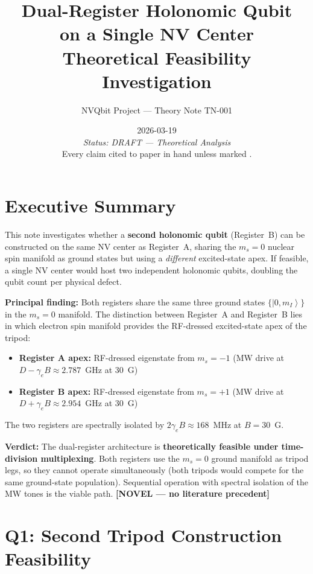 \documentclass[11pt,letterpaper]{article}
\title{\textbf{Dual-Register Holonomic Qubit\\on a Single NV Center}\\[0.5em]
\large Theoretical Feasibility Investigation}
\author{NVQbit Project --- Theory Note TN-001}
\date{2026-03-19\\\medskip
\normalsize\textit{Status: DRAFT --- Theoretical Analysis}\\
\small Every claim cited to paper in hand unless marked \novel.}
\newcommand{\ket}[1]{\left|#1\right\rangle}
\newcommand{\novel}{\textcolor{purple!70!black}{\textbf{[NOVEL --- no literature precedent]}}}
\begin{document}
\maketitle
\thispagestyle{fancy}

\tableofcontents
\newpage

\section{Executive Summary}

This note investigates whether a \textbf{second holonomic qubit} (Register~B) can be constructed on the same NV center as Register~A, sharing the $m_s = 0$ nuclear spin manifold as ground states but using a \emph{different} excited-state apex. If feasible, a single NV center would host two independent holonomic qubits, doubling the qubit count per physical defect.

\medskip
\noindent\textbf{Principal finding:} Both registers share the same three ground states $\{\ket{0, m_I}\}$ in the $m_s = 0$ manifold. The distinction between Register~A and Register~B lies in which electron spin manifold provides the RF-dressed excited-state apex of the tripod:
\begin{itemize}[leftmargin=*]
    \item \textbf{Register A apex:} RF-dressed eigenstate from $m_s = -1$ (MW drive at $D - \gamma_e B \approx 2.787$~GHz at 30~G)
    \item \textbf{Register B apex:} RF-dressed eigenstate from $m_s = +1$ (MW drive at $D + \gamma_e B \approx 2.954$~GHz at 30~G)
\end{itemize}
The two registers are spectrally isolated by $2\gamma_e B \approx 168$~MHz at $B = 30$~G.

\medskip
\noindent\textbf{Verdict:} The dual-register architecture is \textbf{theoretically feasible under time-division multiplexing}. Both registers use the $m_s = 0$ ground manifold as tripod legs, so they cannot operate simultaneously (both tripods would compete for the same ground-state population). Sequential operation with spectral isolation of the MW tones is the viable path. \novel

\section{Q1: Second Tripod Construction Feasibility}
\label{sec:q1}
\end{document}
